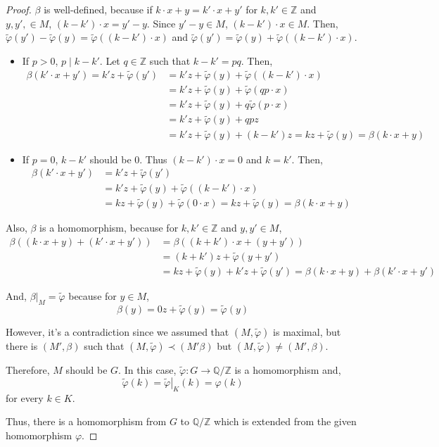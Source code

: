 \documentclass{article}
\newcommand{\bbQ}{\mathbb{Q}}
\newcommand{\bbZ}{\mathbb{Z}}
\begin{document}
\begin{proof}
\(\beta\) is well-defined, because if \(k \cdot x + y = k' \cdot x + y'\) for \(k, k' \in \bbZ\) and \(y, y', \in M\), \((k - k') \cdot x = y' - y\).
Since \(y' - y \in M\), \((k - k') \cdot x \in M\).
Then, \(\tilde\varphi(y') - \tilde\varphi(y) = \tilde\varphi((k - k') \cdot x)\)
and \(\tilde\varphi(y') = \tilde\varphi(y) + \tilde\varphi((k - k') \cdot x)\).
\begin{itemize}
\item If \(p > 0\), \(p \mid k - k'\). Let \(q \in \bbZ\) such that \(k - k' = pq\). Then,
\begin{align*}
  \beta(k' \cdot x + y')
  = k'z + \tilde\varphi(y')
  &= k'z + \tilde\varphi(y) + \tilde\varphi((k - k') \cdot x)
  \\&= k'z + \tilde\varphi(y) + \tilde\varphi(qp \cdot x)
  \\&= k'z + \tilde\varphi(y) + q \tilde\varphi(p \cdot x)
  \\&= k'z + \tilde\varphi(y) + q pz
  \\&= k'z + \tilde\varphi(y) + (k - k')z
  = kz + \tilde\varphi(y)
  = \beta(k \cdot x + y)
\end{align*}
\item If \(p = 0\), \(k - k'\) should be \(0\). Thus \((k - k') \cdot x = 0\) and \(k = k'\). Then,
\begin{align*}
  \beta(k' \cdot x + y')
  &= k'z + \tilde\varphi(y')
  \\&= k'z + \tilde\varphi(y) + \tilde\varphi((k - k') \cdot x)
  \\&= kz + \tilde\varphi(y) + \tilde\varphi(0 \cdot x)
  = kz + \tilde\varphi(y)
  = \beta(k \cdot x + y)
\end{align*}
\end{itemize}

Also, \(\beta\) is a homomorphism, because for \(k, k' \in \bbZ\) and \(y, y' \in M\),
\begin{align*}
  \beta((k \cdot x + y) + (k' \cdot x + y'))
  &= \beta((k + k') \cdot x + (y + y'))
  \\&= (k + k')z + \tilde\varphi(y + y')
  \\&= kz + \tilde\varphi(y) + k'z + \tilde\varphi(y')
  = \beta(k \cdot x + y) + \beta(k' \cdot x + y')
\end{align*}

And, \(\left. \beta \right|_M = \tilde\varphi\) because for \(y \in M\),
\[\beta(y) = 0z + \tilde\varphi(y) = \tilde\varphi(y)\]

However, it's a contradiction since we assumed that \((M, \tilde\varphi)\) is maximal, but there is \((M', \beta)\) such that \((M, \tilde\varphi) \prec (M' \beta)\) but \((M, \tilde\varphi) \neq (M', \beta)\).

Therefore, \(M\) should be \(G\).
In this case, \(\tilde\varphi:G \to \bbQ / \bbZ\) is a homomorphism and, 
\[\tilde\varphi(k) = \left. \tilde\varphi \right|_{K} (k) = \varphi(k)\]
for every \(k \in K\).

Thus, there is a homomorphism from \(G\) to \(\bbQ / \bbZ\) which is extended from the given homomorphism \(\varphi\).
\end{proof}
\end{document}
